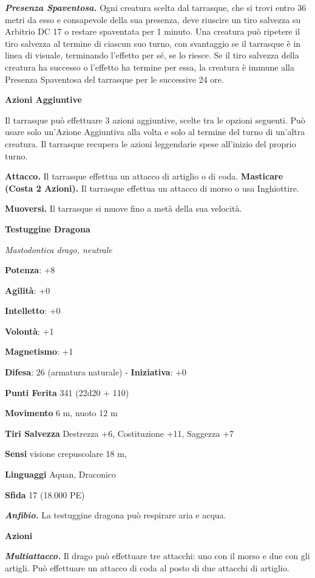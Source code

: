 \begin{multicols}{2}
\emph{\textbf{Presenza Spaventosa.}} Ogni creatura scelta dal tarrasque,
che si trovi entro 36 metri da esso e consapevole della sua presenza,
deve riuscire un tiro salvezza su Arbitrio DC 17 o restare spaventata
per 1 minuto. Una creatura può ripetere il tiro salvezza al termine di
ciascun suo turno, con svantaggio se il tarrasque è in linea di visuale,
terminando l'effetto per sé, se lo riesce. Se il tiro salvezza della
creatura ha successo o l'effetto ha termine per essa, la creatura è
immune alla Presenza Spaventosa del tarrasque per le successive 24 ore.

\textbf{Azioni Aggiuntive}

Il tarrasque può effettuare 3 azioni aggiuntive, scelte tra le opzioni
seguenti. Può usare solo un'Azione Aggiuntiva alla volta e solo al
termine del turno di un'altra creatura. Il tarrasque recupera le azioni
leggendarie spese all'inizio del proprio turno.

\textbf{Attacco.} Il tarrasque effettua un attacco di artiglio o di
coda. \textbf{Masticare (Costa 2 Azioni).} Il tarrasque effettua un
attacco di morso o usa Inghiottire.

\textbf{Muoversi.} Il tarrasque si muove fino a metà della sua velocità.




\textbf{Testuggine Dragona}

\emph{Mastodontica drago, neutrale}

\textbf{Potenza}: +8

\textbf{Agilità}: +0

\textbf{Intelletto}: +0

\textbf{Volontà}: +1

\textbf{Magnetismo}: +1

\textbf{Difesa}: 26 (armatura naturale) - \textbf{Iniziativa}: +0

\textbf{Punti Ferita} 341 (22d20 + 110)

\textbf{Movimento} 6 m, nuoto 12 m

\textbf{Tiri Salvezza} Destrezza +6, Costituzione +11, Saggezza +7

\textbf{Sensi} visione crepuscolare 18 m, 

\textbf{Linguaggi} Aquan, Draconico

\textbf{Sfida} 17 (18.000 PE)

\emph{\textbf{Anfibio.}} La testuggine dragona può respirare aria e
acqua.

\textbf{Azioni}

\emph{\textbf{Multiattacco.}} Il drago può effettuare tre attacchi: uno
con il morso e due con gli artigli. Può effettuare un attacco di coda al
posto di due attacchi di artiglio.


\end{multicols}
